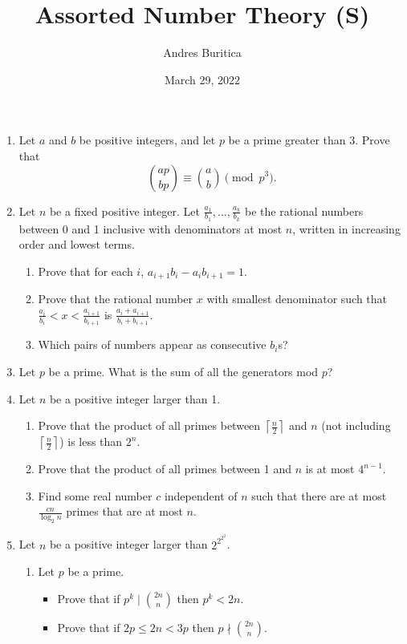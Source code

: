 \documentclass{article}
\title{Assorted Number Theory (S)}
\author{Andres Buritica}
\date{March 29, 2022}
\begin{document}
\maketitle
\begin{enumerate}
  \item Let $a$ and $b$ be positive integers, and let $p$ be a prime greater
    than 3. Prove that
    \[\binom{ap}{bp}\equiv\binom ab\pmod {p^3}.\]
  \item Let $n$ be a fixed positive integer. Let
    $\frac{a_1}{b_1},\ldots,\frac{a_k}{b_k}$ be the rational numbers between 0
    and 1 inclusive with denominators at most $n$, written in increasing order
    and lowest terms.
    \begin{enumerate}
      \item Prove that for each $i$, $a_{i+1}b_i-a_i b_{i+1}=1$.
      \item Prove that the rational number $x$ with smallest denominator such
        that $\frac{a_i}{b_i}<x<\frac{a_{i+1}}{b_{i+1}}$ is
        $\frac{a_i+a_{i+1}}{b_i+b_{i+1}}$. 
      \item Which pairs of numbers appear as consecutive $b_i$s?
    \end{enumerate}
  \item Let $p$ be a prime. What is the sum of all the generators mod $p$?
  \item
    Let $n$ be a positive integer larger than 1.
    \begin{enumerate}
      \item Prove that the product of all primes between $\left\lceil\frac
        n2\right\rceil$ and $n$
        (not including $\left\lceil\frac n2\right\rceil$) is less than $2^n$.
      \item Prove that the product of all primes between 1 and $n$ is at most
        $4^{n-1}$.
      \item Find some real number $c$ independent of $n$ such that there are at
        most $\frac{cn}{\log_2 n}$ primes that are at most $n$.
    \end{enumerate}
  \item 
    Let $n$ be a positive integer larger than $2^{2^{2^2}}$.
    \begin{enumerate}
      \item Let $p$ be a prime.
        \begin{itemize}
          \item Prove that if $p^k\mid\binom{2n}n$ then $p^k<
            2n$.
          \item Prove that if $2p\le 2n< 3p$ then $p\nmid\binom{2n}n$.

\end{itemize}
\end{enumerate}
\end{enumerate}
\end{document}
